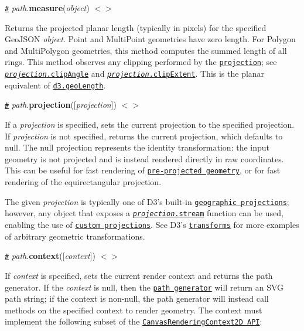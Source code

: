 \href{#path_measure}{\tt \#} {\itshape path}.{\bfseries measure}({\itshape object}) \href{https://github.com/d3/d3-geo/blob/master/src/path/measure.js}{\tt $<$$>$}

Returns the projected planar length (typically in pixels) for the specified Geo\+J\+S\+ON {\itshape object}. Point and Multi\+Point geometries have zero length. For Polygon and Multi\+Polygon geometries, this method computes the summed length of all rings. This method observes any clipping performed by the \href{#path_projection}{\tt projection}; see \href{#projection_clipAngle}{\tt {\itshape projection}.clip\+Angle} and \href{#projection_clipExtent}{\tt {\itshape projection}.clip\+Extent}. This is the planar equivalent of \href{#geoLength}{\tt d3.\+geo\+Length}.

\href{#path_projection}{\tt \#} {\itshape path}.{\bfseries projection}(\mbox{[}{\itshape projection}\mbox{]}) \href{https://github.com/d3/d3-geo/blob/master/src/path/index.js#L48}{\tt $<$$>$}

If a {\itshape projection} is specified, sets the current projection to the specified projection. If {\itshape projection} is not specified, returns the current projection, which defaults to null. The null projection represents the identity transformation\+: the input geometry is not projected and is instead rendered directly in raw coordinates. This can be useful for fast rendering of \href{https://bl.ocks.org/mbostock/5557726}{\tt pre-\/projected geometry}, or for fast rendering of the equirectangular projection.

The given {\itshape projection} is typically one of D3’s built-\/in \href{#projections}{\tt geographic projections}; however, any object that exposes a \href{#projection_stream}{\tt {\itshape projection}.stream} function can be used, enabling the use of \href{https://bl.ocks.org/mbostock/5663666}{\tt custom projections}. See D3’s \href{#transforms}{\tt transforms} for more examples of arbitrary geometric transformations.

\href{#path_context}{\tt \#} {\itshape path}.{\bfseries context}(\mbox{[}{\itshape context}\mbox{]}) \href{https://github.com/d3/d3-geo/blob/master/src/path/index.js#L52}{\tt $<$$>$}

If {\itshape context} is specified, sets the current render context and returns the path generator. If the {\itshape context} is null, then the \href{#_path}{\tt path generator} will return an S\+VG path string; if the context is non-\/null, the path generator will instead call methods on the specified context to render geometry. The context must implement the following subset of the \href{https://www.w3.org/TR/2dcontext/#canvasrenderingcontext2d}{\tt Canvas\+Rendering\+Context2D A\+PI}\+:


